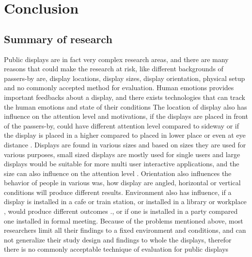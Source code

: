 \chapter{Conclusion} %

\label{Chapter10} %
\newpage



\section{Summary of research}
Public displays are in fact very complex research areas, and there are many reasons that could make the research at risk, like different backgrounds of passers-by are, display locations, display sizes, display orientation, physical setup and no commonly accepted method for evaluation. Human emotions provides important feedbacks about a display, and there exists technologies that can track the human emotions and state of their conditions\cite{TrackeMotion} The location of display also has influence on the attention level and motivations, if the displays are placed in front of the passers-by, could have different attention level compared to sideway or if the display is placed in a higher compared to placed in lower place or even at eye distance \cite{WhenPublicDisplays}. Displays are found in various sizes and based on sizes they are used for various purposes, small sized displays are mostly used for single users and large displays would be suitable for more multi user interactive applications, and the size can also influence on the attention level \cite{WhenPublicDisplays}. Orientation also influences the behavior of people in various was, how display are angled, horizontal or vertical conditions will produce different results\cite{DisplayAngleEffect}. Environment also has influence, if a display is installed in a cafe or train station\cite{multimediaworkplace}, or installed in a library or workplace \cite{multimediaworkplace}, would produce different outcomes \cite{semidisplay}., or if one is installed in a party compared one installed in formal meeting. Because of the problems mentioned above, most researchers limit all their findings to a fixed environment and conditions, and can not generalize their study design and findings to whole the displays, therefor there is no commonly acceptable technique of evaluation for public displays \cite{HowToEvaluate} 

